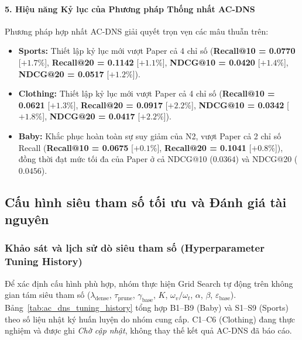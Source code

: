 \paragraph{5. Hiệu năng Kỷ lục của Phương pháp Thống nhất AC-DNS}
Phương pháp hợp nhất AC-DNS giải quyết trọn vẹn các mâu thuẫn trên:
\begin{itemize}[leftmargin=*]
  \item \textbf{Sports:} Thiết lập kỷ lục mới vượt Paper cả 4 chỉ số (\textbf{Recall@10 = 0.0770} [$+1.7\%$], \textbf{Recall@20 = 0.1142} [$+1.1\%$], \textbf{NDCG@10 = 0.0420} [$+1.4\%$], \textbf{NDCG@20 = 0.0517} [$+1.2\%$]).
  \item \textbf{Clothing:} Thiết lập kỷ lục mới vượt Paper cả 4 chỉ số (\textbf{Recall@10 = 0.0621} [$+1.3\%$], \textbf{Recall@20 = 0.0917} [$+2.2\%$], \textbf{NDCG@10 = 0.0342} [$+1.8\%$], \textbf{NDCG@20 = 0.0417} [$+2.2\%$]).
  \item \textbf{Baby:} Khắc phục hoàn toàn sự suy giảm của N2, vượt Paper cả 2 chỉ số Recall (\textbf{Recall@10 = 0.0675} [$+0.1\%$], \textbf{Recall@20 = 0.1041} [$+0.8\%$]), đồng thời đạt mức tối đa của Paper ở cả NDCG@10 ($0.0364$) và NDCG@20 ($0.0456$).
\end{itemize}

\subsection{Cấu hình siêu tham số tối ưu và Đánh giá tài nguyên}
\label{sec:negcl_tuning_resources}

\subsubsection{Khảo sát và lịch sử dò siêu tham số (Hyperparameter Tuning History)}

Để xác định cấu hình phù hợp, nhóm thực hiện Grid Search tự động trên không gian tám siêu tham số ($\lambda_{\text{dense}}$, $\tau_{\text{prune}}$, $\gamma_{\text{base}}$, $K$, $\omega_v/\omega_t$, $\alpha$, $\beta$, $\varepsilon_{\text{base}}$). Bảng~\ref{tab:ac_dns_tuning_history} tổng hợp B1--B9 (Baby) và S1--S9 (Sports) theo số liệu nhật ký huấn luyện do nhóm cung cấp. C1--C6 (Clothing) đang thực nghiệm và được ghi \textit{Chờ cập nhật}, không thay thế kết quả AC-DNS đã báo cáo.


